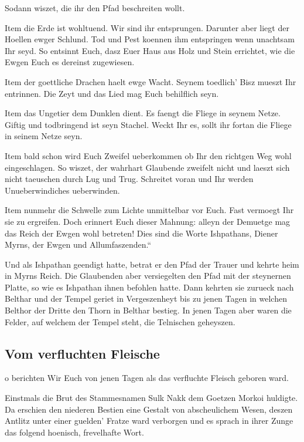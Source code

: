 \documentclass[a5paper,8pt]{book}
\begin{document}
Sodann wiszet, die ihr den Pfad beschreiten wollt.

Item die Erde ist wohltuend. Wir sind ihr entsprungen. Darunter aber liegt der Hoellen ewger Schlund. Tod und Pest koennen ihm entspringen wenn unachtsam Ihr seyd. So entsinnt Euch, dasz Euer Haus aus Holz und Stein errichtet, wie die Ewgen Euch es dereinst zugewiesen.

Item der goettliche Drachen haelt ewge Wacht. Seynem toedlich’ Bisz mueszt Ihr entrinnen. Die Zeyt und das Lied mag Euch behilflich seyn.

Item das Ungetier dem Dunklen dient. Es faengt die Fliege in seynem Netze. Giftig und todbringend ist seyn Stachel. Weckt Ihr es, sollt ihr fortan die Fliege in seinem Netze seyn. 

Item bald schon wird Euch Zweifel ueberkommen ob Ihr den richtgen Weg wohl eingeschlagen. So wiszet, der wahrhart Glaubende zweifelt nicht und laeszt sich nicht taeuschen durch Lug und Trug. Schreitet voran und Ihr werden Unueberwindiches ueberwinden.

Item nunmehr die Schwelle zum Lichte unmittelbar vor Euch. Fast vermoegt Ihr sie zu ergreifen. Doch erinnert Euch dieser Mahnung: alleyn der Demuetge mag das Reich der Ewgen wohl betreten! 
Dies sind die Worte Ishpathans, Diener Myrns, der Ewgen und Allumfaszenden.“

Und als Ishpathan geendigt hatte, betrat er den Pfad der Trauer und kehrte heim in Myrns Reich. Die Glaubenden aber versiegelten den Pfad mit der steynernen Platte, so wie es Ishpathan ihnen befohlen hatte. Dann kehrten sie zurueck nach Belthar und der Tempel geriet in Vergeszenheyt bis zu jenen Tagen in welchen Belthor der Dritte den Thorn in Belthar bestieg. In jenen Tagen aber waren die Felder, auf welchem der Tempel steht, die Telnischen geheyszen. 

\newpage

\subsection{ Vom verfluchten Fleische}

o berichten Wir Euch von jenen Tagen als das verfluchte Fleisch geboren ward. 

Einstmals die Brut des Stammesnamen Sulk Nakk dem Goetzen Morkoi huldigte.
Da erschien den niederen Bestien eine Gestalt von abscheulichem Wesen, deszen Antlitz unter einer guelden’ Fratze ward verborgen und es sprach in ihrer Zunge das folgend hoenisch, frevelhafte Wort.
\end{document}
